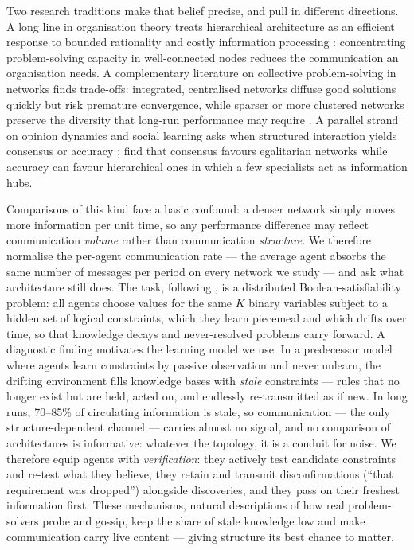 \documentclass{article}
\begin{document}
Two research traditions make that belief precise, and pull in different directions. A long line in organisation theory treats hierarchical architecture as an efficient response to bounded rationality and costly information processing \parencite{simon1962architecture, radner1993organization, bolton1994firm}: concentrating problem-solving capacity in well-connected nodes reduces the communication an organisation needs. A complementary literature on collective problem-solving in networks finds trade-offs: integrated, centralised networks diffuse good solutions quickly but risk premature convergence, while sparser or more clustered networks preserve the diversity that long-run performance may require \parencite{lazer2007network, mason2008propagation, fang2010balancing, shore2015facts, barkoczi2016social}. A parallel strand on opinion dynamics and social learning asks when structured interaction yields consensus or accuracy \parencite{noorazar2020classical, bala1998learning, jackson2011overview}; \textcite{berekmeri2020optimal} find that consensus favours egalitarian networks while accuracy can favour hierarchical ones in which a few specialists act as information hubs.

Comparisons of this kind face a basic confound: a denser network simply moves more information per unit time, so any performance difference may reflect communication \emph{volume} rather than communication \emph{structure}. We therefore normalise the per-agent communication rate --- the average agent absorbs the same number of messages per period on every network we study --- and ask what architecture still does. The task, following \textcite{hebert2025governance}, is a distributed Boolean-satisfiability problem: all agents choose values for the same $K$ binary variables subject to a hidden set of logical constraints, which they learn piecemeal and which drifts over time, so that knowledge decays and never-resolved problems carry forward. A diagnostic finding motivates the learning model we use. In a predecessor model where agents learn constraints by passive observation and never unlearn, the drifting environment fills knowledge bases with \emph{stale} constraints --- rules that no longer exist but are held, acted on, and endlessly re-transmitted as if new. In long runs, 70--85\% of circulating information is stale, so communication --- the only structure-dependent channel --- carries almost no signal, and no comparison of architectures is informative: whatever the topology, it is a conduit for noise. We therefore equip agents with \emph{verification}: they actively test candidate constraints and re-test what they believe, they retain and transmit disconfirmations (``that requirement was dropped'') alongside discoveries, and they pass on their freshest information first. These mechanisms, natural descriptions of how real problem-solvers probe and gossip, keep the share of stale knowledge low and make communication carry live content --- giving structure its best chance to matter.
\end{document}
